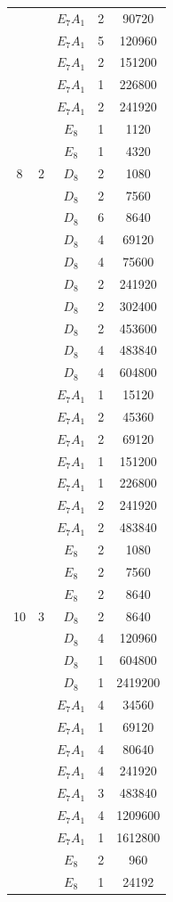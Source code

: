 \documentclass{amsart}
\theoremstyle{definition}
\theoremstyle{plain}
\begin{document}
\begin{longtable}{ccccc}
 & & \(E_{7} A_{1} \) &2 & 90720 \\
 & & \(E_{7} A_{1} \) &5 & 120960 \\
 & & \(E_{7} A_{1} \) &2 & 151200 \\
 & & \(E_{7} A_{1} \) &1 & 226800 \\
 & & \(E_{7} A_{1} \) &2 & 241920 \\
 & & \(E_{8} \) &1 & 1120 \\
 & & \(E_{8} \) &1 & 4320 \\
8 & 2& \(D_{8} \) &2 & 1080 \\
 & & \(D_{8} \) &2 & 7560 \\
 & & \(D_{8} \) &6 & 8640 \\
 & & \(D_{8} \) &4 & 69120 \\
 & & \(D_{8} \) &4 & 75600 \\
 & & \(D_{8} \) &2 & 241920 \\
 & & \(D_{8} \) &2 & 302400 \\
 & & \(D_{8} \) &2 & 453600 \\
 & & \(D_{8} \) &4 & 483840 \\
 & & \(D_{8} \) &4 & 604800 \\
 & & \(E_{7} A_{1} \) &1 & 15120 \\
 & & \(E_{7} A_{1} \) &2 & 45360 \\
 & & \(E_{7} A_{1} \) &2 & 69120 \\
 & & \(E_{7} A_{1} \) &1 & 151200 \\
 & & \(E_{7} A_{1} \) &1 & 226800 \\
 & & \(E_{7} A_{1} \) &2 & 241920 \\
 & & \(E_{7} A_{1} \) &2 & 483840 \\
 & & \(E_{8} \) &2 & 1080 \\
 & & \(E_{8} \) &2 & 7560 \\
 & & \(E_{8} \) &2 & 8640 \\
10 & 3& \(D_{8} \) &2 & 8640 \\
 & & \(D_{8} \) &4 & 120960 \\
 & & \(D_{8} \) &1 & 604800 \\
 & & \(D_{8} \) &1 & 2419200 \\
 & & \(E_{7} A_{1} \) &4 & 34560 \\
 & & \(E_{7} A_{1} \) &1 & 69120 \\
 & & \(E_{7} A_{1} \) &4 & 80640 \\
 & & \(E_{7} A_{1} \) &4 & 241920 \\
 & & \(E_{7} A_{1} \) &3 & 483840 \\
 & & \(E_{7} A_{1} \) &4 & 1209600 \\
 & & \(E_{7} A_{1} \) &1 & 1612800 \\
 & & \(E_{8} \) &2 & 960 \\
 & & \(E_{8} \) &1 & 24192 \\
\bottomrule
\end{longtable}
\end{document}
